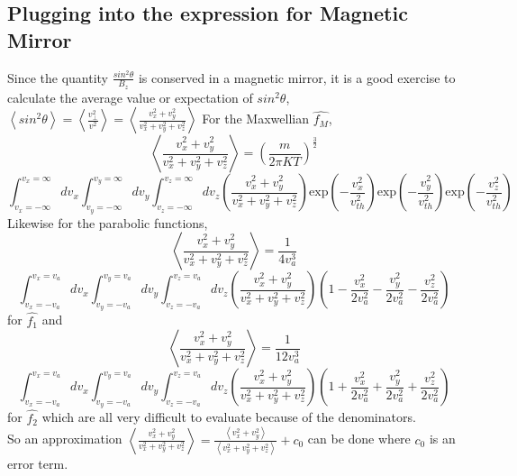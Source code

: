 \documentclass[12pt]{article}
\begin{document}
{	\subsection{Plugging into the expression for Magnetic Mirror}
	\noindent Since the quantity $\frac{\displaystyle sin^{2}\theta}{\displaystyle B_{z}}$ is conserved in a magnetic mirror, it is a good exercise to calculate the average value or expectation of $sin^{2}\theta$, $\left\langle sin^{2}\theta\right\rangle = \left\langle \frac{\displaystyle v_{\perp}^{2}}{\displaystyle v^{2}}\right\rangle = \left\langle \frac{\displaystyle v_{x}^{2} + v_{y}^{2}}{\displaystyle v_{x}^{2} + v_{y}^{2} +  v_{z}^{2}}\right\rangle $ 
	For the Maxwellian $\widehat{f_{M}}$,
	$$\left\langle \frac{\displaystyle v_{x}^{2} + v_{y}^{2}}{\displaystyle v_{x}^{2} + v_{y}^{2} +  v_{z}^{2}}\right\rangle = \left(\frac{m}{2\pi KT}\right)^{\frac{3}{2}} $$ 
	$$ \int_{v_{x} = - \infty}^{v_{x} = \infty} d v_{x} \int_{v_{y} = - \infty}^{v_{y} = \infty} d v_{y} \int_{v_{z} = - \infty}^{v_{z} = \infty} d v_{z} \left( \frac{\displaystyle v_{x}^{2} + v_{y}^{2}}{\displaystyle v_{x}^{2} + v_{y}^{2} + v_{z}^{2}} \right)  \mathrm{exp}\left(-\frac{v_{x}^{2}}{v_{th}^{2}}\right) \mathrm{exp}\left(-\frac{v_{y}^{2}}{v_{th}^{2}}\right) \mathrm{exp}\left(-\frac{v_{z}^{2}}{v_{th}^{2}}\right)$$
	Likewise for the parabolic functions,
	$$\left\langle \frac{\displaystyle v_{x}^{2} + v_{y}^{2}}{\displaystyle v_{x}^{2} + v_{y}^{2} +  v_{z}^{2}}\right\rangle = \frac{1}{4 v_{a}^{3}} $$ $$\int_{v_{x} = - v_{a}}^{v_{x} = v_{a}} d v_{x} \int_{v_{y} = - v_{a}}^{v_{y} = v_{a}} d v_{y} \int_{v_{z} = - v_{a}}^{v_{z} = v_{a}} d v_{z} \left( \frac{\displaystyle v_{x}^{2} + v_{y}^{2}}{\displaystyle v_{x}^{2} + v_{y}^{2} + v_{z}^{2}} \right)  \left(1 - \frac{v_{x}^{2}}{2 v_{a}^2} - \frac{v_{y}^{2}}{2 v_{a}^2} - \frac{v_{z}^{2}}{2 v_{a}^2} \right) $$
	for $\hat{f_{1}}$ and
	$$\left\langle \frac{\displaystyle v_{x}^{2} + v_{y}^{2}}{\displaystyle v_{x}^{2} + v_{y}^{2} +  v_{z}^{2}}\right\rangle = \frac{1}{12 v_{a}^{3}} $$ $$\int_{v_{x} = - v_{a}}^{v_{x} = v_{a}} d v_{x} \int_{v_{y} = - v_{a}}^{v_{y} = v_{a}} d v_{y} \int_{v_{z} = - v_{a}}^{v_{z} = v_{a}} d v_{z} \left( \frac{\displaystyle v_{x}^{2} + v_{y}^{2}}{\displaystyle v_{x}^{2} + v_{y}^{2} + v_{z}^{2}} \right)  \left(1 + \frac{v_{x}^{2}}{2 v_{a}^2} + \frac{v_{y}^{2}}{2 v_{a}^2} + \frac{v_{z}^{2}}{2 v_{a}^2} \right) $$
	for $\hat{f_{2}}$ which are all very difficult to evaluate because of the denominators. \\
	\noindent So an approximation $\left\langle \frac{\displaystyle v_{x}^{2} + v_{y}^{2}}{\displaystyle v_{x}^{2} + v_{y}^{2} +  v_{z}^{2}}\right\rangle =  \frac{\displaystyle \left\langle v_{x}^{2} + v_{y}^{2}\right\rangle}  {\displaystyle \left\langle v_{x}^{2} + v_{y}^{2} +  v_{z}^{2}\right\rangle} + c_{0}$ can be done where $c_{0}$ is an error term.\\
	
}
\end{document}
